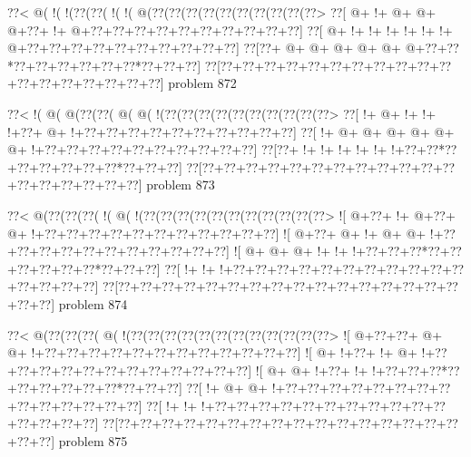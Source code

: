 \vbox{\vbox{\goo
\0??<\- @(\- !(\- !(\0??(\0??(\- !(\- !(\- @(\0??(\0??(\0??(\0??(\0??(\0??(\0??(\0??(\0??(\0??>
\0??[\- @+\- !+\- @+\- @+\- @+\0??+\- !+\- @+\0??+\0??+\0??+\0??+\0??+\0??+\0??+\0??+\0??+\0??]
\0??[\- @+\- !+\- !+\- !+\- !+\- !+\- !+\- @+\0??+\0??+\0??+\0??+\0??+\0??+\0??+\0??+\0??+\0??]
\0??[\0??+\- @+\- @+\- @+\- @+\- @+\- @+\0??+\0??*\0??+\0??+\0??+\0??+\0??+\0??*\0??+\0??+\0??]
\0??[\0??+\0??+\0??+\0??+\0??+\0??+\0??+\0??+\0??+\0??+\0??+\0??+\0??+\0??+\0??+\0??+\0??+\0??]
}
\hfil problem 872\hfil\break
}



\vbox{\vbox{\goo
\0??<\- !(\- @(\- @(\0??(\0??(\- @(\- @(\- !(\0??(\0??(\0??(\0??(\0??(\0??(\0??(\0??(\0??(\0??>
\0??[\- !+\- @+\- !+\- !+\- !+\0??+\- @+\- !+\0??+\0??+\0??+\0??+\0??+\0??+\0??+\0??+\0??+\0??]
\0??[\- !+\- @+\- @+\- @+\- @+\- @+\- @+\- !+\0??+\0??+\0??+\0??+\0??+\0??+\0??+\0??+\0??+\0??]
\0??[\0??+\- !+\- !+\- !+\- !+\- !+\- !+\0??+\0??*\0??+\0??+\0??+\0??+\0??+\0??*\0??+\0??+\0??]
\0??[\0??+\0??+\0??+\0??+\0??+\0??+\0??+\0??+\0??+\0??+\0??+\0??+\0??+\0??+\0??+\0??+\0??+\0??]
}
\hfil problem 873\hfil\break
}



\vbox{\vbox{\goo
\0??<\- @(\0??(\0??(\0??(\- !(\- @(\- !(\0??(\0??(\0??(\0??(\0??(\0??(\0??(\0??(\0??(\0??(\0??>
\- ![\- @+\0??+\- !+\- @+\0??+\- @+\- !+\0??+\0??+\0??+\0??+\0??+\0??+\0??+\0??+\0??+\0??+\0??]
\- ![\- @+\0??+\- @+\- !+\- @+\- @+\- !+\0??+\0??+\0??+\0??+\0??+\0??+\0??+\0??+\0??+\0??+\0??]
\- ![\- @+\- @+\- @+\- !+\- !+\- !+\0??+\0??+\0??*\0??+\0??+\0??+\0??+\0??+\0??*\0??+\0??+\0??]
\0??[\- !+\- !+\- !+\0??+\0??+\0??+\0??+\0??+\0??+\0??+\0??+\0??+\0??+\0??+\0??+\0??+\0??+\0??]
\0??[\0??+\0??+\0??+\0??+\0??+\0??+\0??+\0??+\0??+\0??+\0??+\0??+\0??+\0??+\0??+\0??+\0??+\0??]
}
\hfil problem 874\hfil\break
}



\vbox{\vbox{\goo
\0??<\- @(\0??(\0??(\0??(\- @(\- !(\0??(\0??(\0??(\0??(\0??(\0??(\0??(\0??(\0??(\0??(\0??(\0??>
\- ![\- @+\0??+\0??+\- @+\- @+\- !+\0??+\0??+\0??+\0??+\0??+\0??+\0??+\0??+\0??+\0??+\0??+\0??]
\- ![\- @+\- !+\0??+\- !+\- @+\- !+\0??+\0??+\0??+\0??+\0??+\0??+\0??+\0??+\0??+\0??+\0??+\0??]
\- ![\- @+\- @+\- !+\0??+\- !+\- !+\0??+\0??+\0??*\0??+\0??+\0??+\0??+\0??+\0??*\0??+\0??+\0??]
\0??[\- !+\- @+\- @+\- !+\0??+\0??+\0??+\0??+\0??+\0??+\0??+\0??+\0??+\0??+\0??+\0??+\0??+\0??]
\0??[\- !+\- !+\- !+\0??+\0??+\0??+\0??+\0??+\0??+\0??+\0??+\0??+\0??+\0??+\0??+\0??+\0??+\0??]
\0??[\0??+\0??+\0??+\0??+\0??+\0??+\0??+\0??+\0??+\0??+\0??+\0??+\0??+\0??+\0??+\0??+\0??+\0??]
}
\hfil problem 875\hfil\break
}



